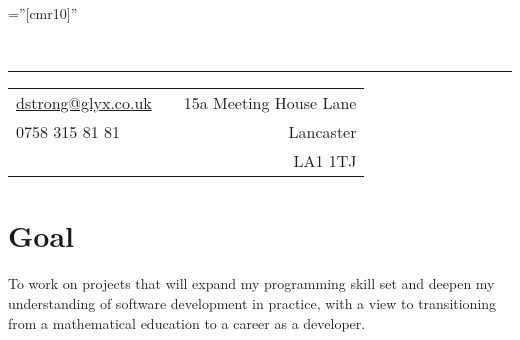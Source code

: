 \documentclass[a4paper,10pt]{article} %
\begin{document}
\pagestyle{empty} %

\font\fb=''[cmr10]'' %


\\ %
\hrule
\footnotesize{
\begin{tabularx}{\textwidth}{lXr}
\href{mailto:dstrong@glyx.co.uk}{dstrong@glyx.co.uk}    & & {15a Meeting House Lane}\\
{0758 315 81 81}                                        & & {Lancaster}\\ 
                                                        & & {LA1 1TJ}
\end{tabularx}
}


\section{\SC Goal}

\begin{flushleft}
To work on projects that will expand my programming skill set and deepen my understanding of software development in practice, with a view to transitioning from a mathematical education to a career as a developer.
\end{flushleft}

\end{document}

